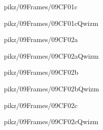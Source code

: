 \documentclass[9pt,xcolor={svgnames, x11names}]{beamer}
\begin{document}

\begin{frame}{pikz/09Frames/09CF01c}
  
\end{frame}


\begin{frame}{pikz/09Frames/09CF01cQwizm}
  
\end{frame}


\begin{frame}{pikz/09Frames/09CF02a}
  
\end{frame}


\begin{frame}{pikz/09Frames/09CF02aQwizm}
  
\end{frame}


\begin{frame}{pikz/09Frames/09CF02b}
  
\end{frame}


\begin{frame}{pikz/09Frames/09CF02bQwizm}
  
\end{frame}


\begin{frame}{pikz/09Frames/09CF02c}
  
\end{frame}


\begin{frame}{pikz/09Frames/09CF02cQwizm}
  
\end{frame}
\end{document}
